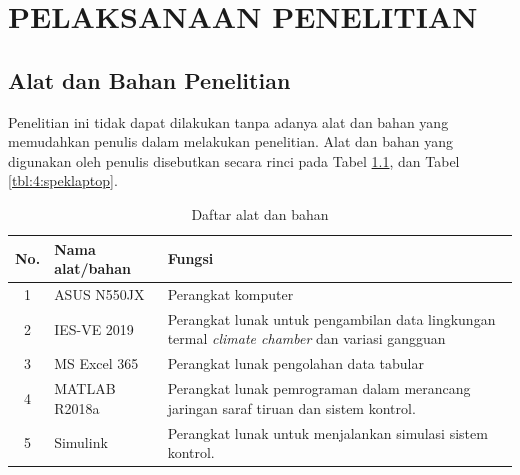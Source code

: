 \chapter{PELAKSANAAN PENELITIAN}
\label{pelaksanaan-penelitian}

\section{Alat dan Bahan Penelitian}
Penelitian ini tidak dapat dilakukan tanpa adanya alat dan bahan yang memudahkan penulis dalam melakukan penelitian. Alat dan bahan yang digunakan oleh penulis disebutkan secara rinci pada Tabel \ref{tbl:4:alatbahan}, dan Tabel \ref{tbl:4:speklaptop}.

\vspace{2em}
\begin{table}[!h]
	\caption{Daftar alat dan bahan}
	\label{tbl:4:alatbahan}
	\centering
	\begin{tabular}{|c|p{3.6cm}|p{9cm}|}
		\hline
		No. & Nama alat/bahan & Fungsi \\
		\hline
		1 & ASUS N550JX & Perangkat komputer \\ \hline
		2 & IES-VE 2019 & Perangkat lunak untuk pengambilan data lingkungan termal \textit{climate chamber} dan variasi gangguan \\ \hline
		3 & MS Excel 365 & Perangkat lunak pengolahan data tabular \\ \hline
		4 & MATLAB R2018a & Perangkat lunak pemrograman dalam merancang jaringan saraf tiruan dan sistem kontrol. \\ \hline
		5 & Simulink & Perangkat lunak untuk menjalankan simulasi sistem kontrol. \\ \hline
	\end{tabular}
\end{table}

